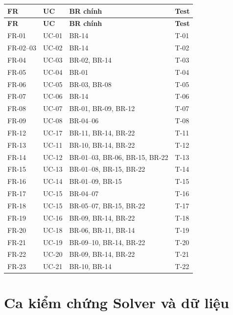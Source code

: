 \documentclass[12pt,a4paper]{report}
\begin{document}
\begin{longtable}{|p{2.3cm}|p{2.4cm}|p{6.7cm}|p{1.5cm}|}
\hline
\textbf{FR} & \textbf{UC} & \textbf{BR chính} & \textbf{Test} \\\hline
\endfirsthead
\hline
\textbf{FR} & \textbf{UC} & \textbf{BR chính} & \textbf{Test} \\\hline
\endhead
FR-01 & UC-01 & BR-14 & T-01 \\\hline
FR-02--03 & UC-02 & BR-14 & T-02 \\\hline
FR-04 & UC-03 & BR-02, BR-14 & T-03 \\\hline
FR-05 & UC-04 & BR-01 & T-04 \\\hline
FR-06 & UC-05 & BR-03, BR-08 & T-05 \\\hline
FR-07 & UC-06 & BR-14 & T-06 \\\hline
FR-08 & UC-07 & BR-01, BR-09, BR-12 & T-07 \\\hline
FR-09 & UC-08 & BR-04--06 & T-08 \\\hline
FR-12 & UC-17 & BR-11, BR-14, BR-22 & T-11 \\\hline
FR-13 & UC-11 & BR-10, BR-14, BR-22 & T-12 \\\hline
FR-14 & UC-12 & BR-01--03, BR-06, BR-15, BR-22 & T-13 \\\hline
FR-15 & UC-13 & BR-01--08, BR-15, BR-22 & T-14 \\\hline
FR-16 & UC-14 & BR-01--09, BR-15 & T-15 \\\hline
FR-17 & UC-15 & BR-04--07 & T-16 \\\hline
FR-18 & UC-15 & BR-05--07, BR-15, BR-22 & T-17 \\\hline
FR-19 & UC-16 & BR-09, BR-14, BR-22 & T-18 \\\hline
FR-20 & UC-18 & BR-06, BR-11, BR-14 & T-19 \\\hline
FR-21 & UC-19 & BR-09--10, BR-14, BR-22 & T-20 \\\hline
FR-22 & UC-20 & BR-09, BR-14, BR-22 & T-21 \\\hline
FR-23 & UC-21 & BR-10, BR-14 & T-22 \\\hline
\end{longtable}


\section{Ca kiểm chứng Solver và dữ liệu}\label{sec:solver-tests}
\end{document}
